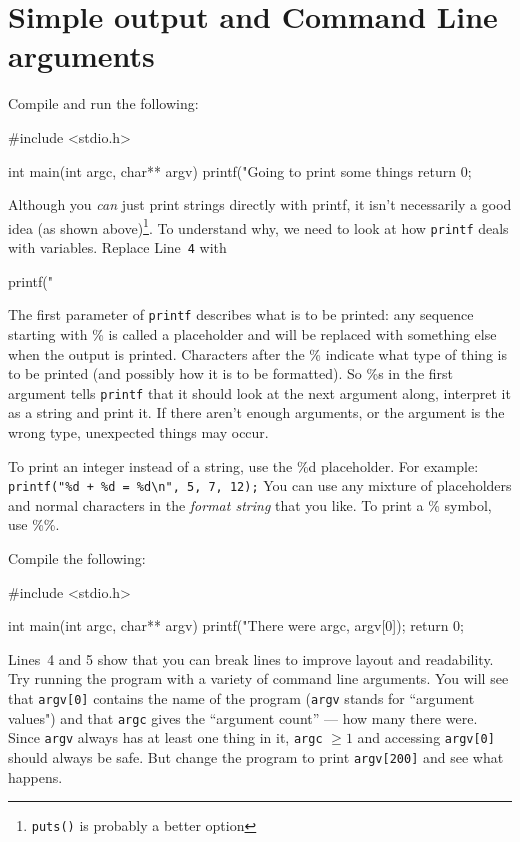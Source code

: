
\chapter{Simple output and Command Line arguments}


Compile and run the following:
\begin{codeblock}
#include <stdio.h>

int main(int argc, char** argv) {
    printf("Going to print some things %
    return 0;
}
\end{codeblock}

Although you \emph{can} just print strings directly with printf, it isn't necessarily a good idea (as shown above)\footnote{\texttt{puts()} is probably a better option}.
To understand why, we need to look at how \texttt{printf} deals with variables.
Replace Line~\texttt{4} with
\begin{codeinline}
printf("%
\end{codeinline}

The first parameter of \texttt{printf} describes what is to be printed: any sequence starting with \% is called a placeholder and will be replaced with something else when the output is printed.
Characters after the \% indicate what type of thing is to be printed (and possibly how it is to be formatted).
So \%s in the first argument tells \texttt{printf} that it should look at the next argument along, interpret it as a string and print it.
If there aren't enough arguments, or the argument is the wrong type, unexpected things may occur.

To print an integer instead of a string, use the \%d placeholder.
For example: \lstinline!printf("%d + %d = %d\n", 5, 7, 12);!
You can use any mixture of placeholders and normal characters in the \emph{format string} that you like.
To print a \% symbol, use \%\%.


Compile the following:
\begin{codeblock}
#include <stdio.h>

int main(int argc, char** argv) {
    printf("There were %
      argc, argv[0]);
    return 0;
}
\end{codeblock}
Lines~4 and 5 show that you can break lines to improve layout and readability.
Try running the program with a variety of command line arguments.
You will see that \texttt{argv[0]} contains the name of the program (\texttt{argv} stands for ``argument values") and that \texttt{argc} gives the ``argument count'' --- how many there were.
Since \texttt{argv} always has at least one thing in it, \texttt{argc} $\geq 1$ and accessing \texttt{argv[0]} should always be safe.
But change the program to print \texttt{argv[200]} and see what happens.


